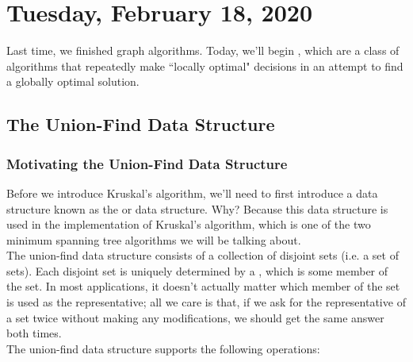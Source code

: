 \newpage

\section{Tuesday, February 18, 2020}

Last time, we finished graph algorithms. Today, we'll begin , which are a class of algorithms that repeatedly make ``locally optimal" decisions in an attempt to find a globally optimal solution.


\subsection{The Union-Find Data Structure}

\subsubsection{Motivating the Union-Find Data Structure}


Before we introduce Kruskal's algorithm, we'll need to first introduce a data structure known as the  or  data structure. Why? Because this data structure is used in the implementation of Kruskal's algorithm, which is one of the two minimum spanning tree algorithms we will be talking about. \\

The union-find data structure consists of a collection of disjoint sets (i.e. a set of sets). Each disjoint set is uniquely determined by a , which is some member of the set. In most applications, it doesn't actually matter which member of the set is used as the representative; all we care is that, if we ask for the representative of a set twice without making any modifications, we should get the same answer both times. \\

The union-find data structure supports the following operations:

